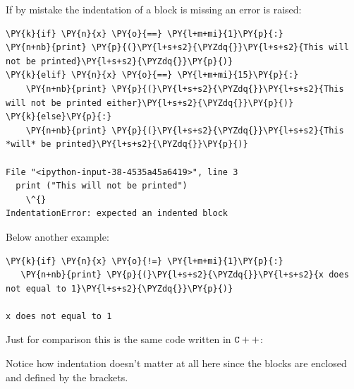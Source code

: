 If by mistake the indentation of a block is missing an error is raised:
\begin{tcolorbox}[breakable, size=fbox, boxrule=1pt, pad at break*=1mm, colback=cellbackground, colframe=cellborder]            
\begin{Verbatim}[commandchars=\\\{\}]
\PY{k}{if} \PY{n}{x} \PY{o}{==} \PY{l+m+mi}{1}\PY{p}{:} 
\PY{n+nb}{print} \PY{p}{(}\PY{l+s+s2}{\PYZdq{}}\PY{l+s+s2}{This will not be printed}\PY{l+s+s2}{\PYZdq{}}\PY{p}{)}
\PY{k}{elif} \PY{n}{x} \PY{o}{==} \PY{l+m+mi}{15}\PY{p}{:}
    \PY{n+nb}{print} \PY{p}{(}\PY{l+s+s2}{\PYZdq{}}\PY{l+s+s2}{This will not be printed either}\PY{l+s+s2}{\PYZdq{}}\PY{p}{)}
\PY{k}{else}\PY{p}{:}
    \PY{n+nb}{print} \PY{p}{(}\PY{l+s+s2}{\PYZdq{}}\PY{l+s+s2}{This *will* be printed}\PY{l+s+s2}{\PYZdq{}}\PY{p}{)}

File "<ipython-input-38-4535a45a6419>", line 3
  print ("This will not be printed")
    \^{}
IndentationError: expected an indented block
\end{Verbatim}
\end{tcolorbox}

Below another example:
\begin{tcolorbox}[breakable, size=fbox, boxrule=1pt, pad at break*=1mm, colback=cellbackground, colframe=cellborder]            
\begin{Verbatim}[commandchars=\\\{\}]
\PY{k}{if} \PY{n}{x} \PY{o}{!=} \PY{l+m+mi}{1}\PY{p}{:}
   \PY{n+nb}{print} \PY{p}{(}\PY{l+s+s2}{\PYZdq{}}\PY{l+s+s2}{x does not equal to 1}\PY{l+s+s2}{\PYZdq{}}\PY{p}{)}

x does not equal to 1
\end{Verbatim}
\end{tcolorbox}

Just for comparison this is the same code written in $\tt{C++}$:

\begin{Shaded}
\begin{Highlighting}[]
\NormalTok{) \{}
\NormalTok{);}
\NormalTok{\}}
 \NormalTok{) \{}
\NormalTok{);}
\NormalTok{\}}
\NormalTok{ \{}
\NormalTok{);}
\NormalTok{\}}
\end{Highlighting}
\end{Shaded}
Notice how indentation doesn't matter at all here since the blocks are enclosed and 
defined by the brackets.

